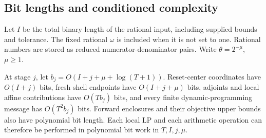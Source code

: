 \subsection{Bit lengths and conditioned complexity}

Let $I$ be the total binary length of the rational input, including supplied
bounds and tolerance.  The fixed rational $\omega$ is included when it is
not set to one.  Rational numbers are stored as reduced numerator-denominator
pairs.  Write $\theta=2^{-\mu}$, $\mu\ge1$.

\begin{lemma}
\label{lem:bit-size}
At stage $j$, let $b_j=O(I+j+\mu+\log(T+1))$.  Reset-center coordinates
have $O(I+j)$ bits, fresh shell endpoints have $O(I+j+\mu)$ bits, adjoints
and local affine contributions have $O(Tb_j)$ bits, and every finite
dynamic-programming message has $O(T^2b_j)$ bits.  Forward enclosures and
their objective upper bounds also have polynomial bit length.  Each local
LP and each arithmetic operation can therefore be performed in polynomial
bit work in $T,I,j,\mu$.
\end{lemma}

